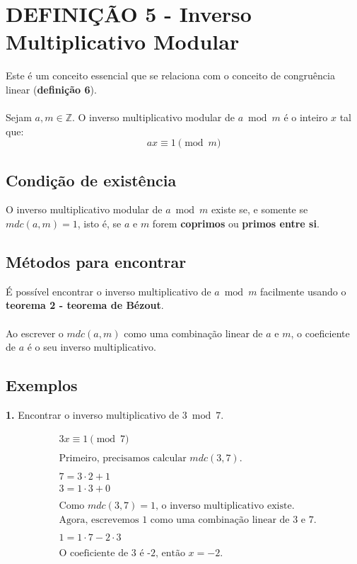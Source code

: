 \section{DEFINIÇÃO 5 - Inverso Multiplicativo Modular}
Este é um conceito essencial que se relaciona com o conceito de congruência linear (\textbf{definição 6}).\\\\
Sejam $a,m \in \mathbb{Z}$. O inverso multiplicativo modular de $a \bmod m$ é o inteiro $x$ tal que:
\[
    ax \equiv 1 \pmod m
\]

\subsection{Condição de existência}
O inverso multiplicativo modular de $a \bmod m$ existe se, e somente se $mdc(a,m) = 1$, isto é, se $a$ e $m$ forem \textbf{coprimos} ou \textbf{primos entre si}.\\

\subsection{Métodos para encontrar}
É possível encontrar o inverso multiplicativo de $a \bmod m$ facilmente usando o \textbf{teorema 2 - teorema de Bézout}.
\\\\Ao escrever o $mdc(a,m)$ como uma combinação linear de $a$ e $m$, o coeficiente de $a$ é o seu inverso multiplicativo.

\subsection*{Exemplos}
\textbf{1.} Encontrar o inverso multiplicativo de $3 \bmod 7$.

\begin{align*}
     & 3x \equiv 1 \pmod 7                                             \\
    \\
     & \text{Primeiro, precisamos calcular $mdc(3,7)$.}                \\
    \\
     & 7 = 3 \cdot 2 + 1                                               \\
     & 3 = 1 \cdot 3 + 0                                               \\
    \\
     & \text{Como $mdc(3,7) = 1$, o inverso multiplicativo existe.}    \\
     & \text{Agora, escrevemos 1 como uma combinação linear de 3 e 7.} \\
    \\
     & 1 = 1 \cdot 7 - 2 \cdot 3                                       \\
    \\
     & \text{O coeficiente de 3 é -2, então $x = -2$.}
\end{align*}

